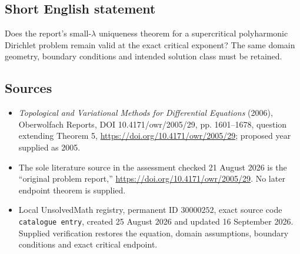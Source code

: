\documentclass[11pt]{article}
\begin{document}
\subsection{Short English statement}
Does the report's small-$\lambda$ uniqueness theorem for a supercritical polyharmonic Dirichlet problem remain valid at the exact critical exponent? The same domain geometry, boundary conditions and intended solution class must be retained.
\subsection{Sources}
\begin{itemize}
\item \emph{Topological and Variational Methods for Differential Equations} (2006), Oberwolfach Reports, DOI 10.4171/owr/2005/29, pp. 1601--1678, question extending Theorem 5, \url{https://doi.org/10.4171/owr/2005/29}; proposed year supplied as 2005.
\item The sole literature source in the assessment checked 21 August 2026 is the ``original problem report,'' \url{https://doi.org/10.4171/owr/2005/29}. No later endpoint theorem is supplied.
\item Local UnsolvedMath registry, permanent ID $30000252$, exact source code \texttt{catalogue entry}, created 25 August 2026 and updated 16 September 2026. Supplied verification restores the equation, domain assumptions, boundary conditions and exact critical endpoint.
\end{itemize}
\end{document}

